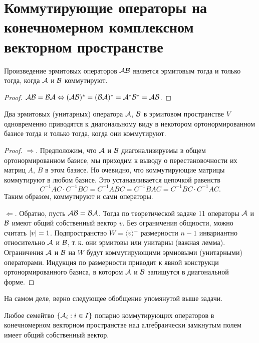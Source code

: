 \section{Коммутирующие операторы на конечномерном комплексном векторном пространстве}

\begin{theorem}
    Произведение эрмитовых операторов $\mathcal{A}\mathcal{B}$ является эрмитовым тогда и только тогда, когда $\mathcal{A}$ и $\mathcal{B}$ коммутируют.
\end{theorem}

\begin{proof}
    $\mathcal{A}\mathcal{B} = \mathcal{B}\mathcal{A} \Leftrightarrow (\mathcal{A}\mathcal{B})^\ast = (\mathcal{B}\mathcal{A})^\ast = \mathcal{A}^\ast\mathcal{B}^\ast = \mathcal{A}\mathcal{B}$.
\end{proof}

\begin{theorem}
    Два эрмитовых (унитарных) оператора $\mathcal{A}$, $\mathcal{B}$ в эрмитовом пространстве $V$ одновременно приводятся к диагональному виду в некотором ортонормированном базисе тогда и только тогда, когда они коммутируют.
\end{theorem}

\begin{proof}
    $\Rightarrow$. Предположим, что $\mathcal{A}$ и $\mathcal{B}$ диагонализируемы в общем ортонормированном базисе, мы приходим к выводу о перестановочности их матриц $A$, $B$ в этом базисе. Но очевидно, что коммутирующие матрицы коммутируют в любом базисе. Это устанавливается цепочкой равенств
    \[
        C^{-1}AC \cdot C^{-1}BC = C^{-1}ABC = C^{-1}BAC = C^{-1}BC \cdot C^{-1}AC.
    \]
    Таким образом, коммутируют и сами операторы.

    $\Leftarrow$. Обратно, пусть $\mathcal{A}\mathcal{B} = \mathcal{B}\mathcal{A}$. Тогда по теоретической задаче 11 операторы $\mathcal{A}$ и $\mathcal{B}$ имеют общий собственный вектор $v$. Без ограничения общности, можно считать $\left\lvert v\right\rvert = 1$. Подпространство $W = \langle v\rangle^\perp$ размерности $n - 1$ инвариантно относительно $\mathcal{A}$ и $\mathcal{B}$, т.\,к. они эрмитовы или унитарны (важная лемма). Ограничения $\mathcal{A}$ и $\mathcal{B}$ на $W$ будут коммутирующими эрмиовыми (унитарными) операторами. Индукция по размерности приводит к явной конструкци ортонормированного базиса, в котором $\mathcal{A}$ и $\mathcal{B}$ запишутся в диагональной форме.
\end{proof}

На самом деле, верно следующее обобщение упомянутой выше задачи.

\begin{theorem}
    Любое семейтво $\{\mathcal{A}_i : i \in I\}$ попарно коммутирующих операторов в конечномерном векторном пространстве над алгебраически замкнутым полем имеет общий собственный вектор.
\end{theorem}

